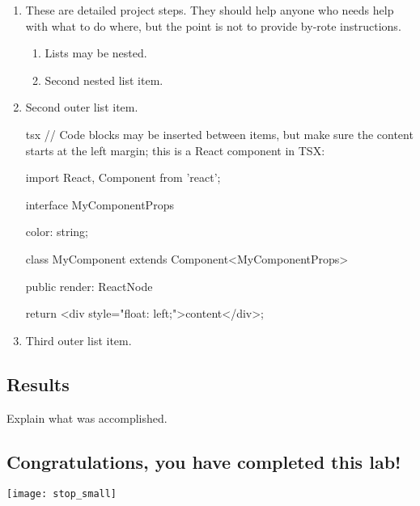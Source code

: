 \documentclass[../workbook]{subfiles}
\begin{document}
\begin{enumerate}
    \item These are detailed project steps. They should help anyone who needs help with what to do where, but the point is not to provide by-rote instructions.
        \begin{enumerate}
            \item Lists may be nested.
            \item Second nested list item.
        \end{enumerate}
    \item Second outer list item.
    \begin{codeblock}{tsx}
// Code blocks may be inserted between items, but make sure the content starts at the left margin; this is a React component in TSX:

import React, { Component } from 'react';

interface MyComponentProps {

    color: string;
}

class MyComponent extends Component<MyComponentProps> {

    public render: ReactNode {

        return <div style="float: left;">content</div>;
    }
}
    \end{codeblock}%
    \item Third outer list item.
\end{enumerate}



\subsection*{Results}

Explain what was accomplished.



\subsection*{\textbf{Congratulations, you have completed this lab!}}

\texttt{[image: stop\_small]}
\end{document}
